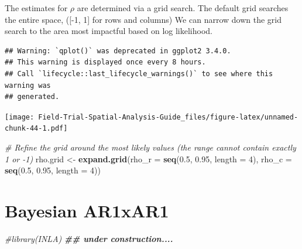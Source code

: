 \documentclass[
]{book}
\newenvironment{Shaded}{\begin{snugshade}}{\end{snugshade}}
\newcommand{\AttributeTok}[1]{\textcolor[rgb]{0.13,0.29,0.53}{#1}}
\newcommand{\CommentTok}[1]{\textcolor[rgb]{0.56,0.35,0.01}{\textit{#1}}}
\newcommand{\DecValTok}[1]{\textcolor[rgb]{0.00,0.00,0.81}{#1}}
\newcommand{\DocumentationTok}[1]{\textcolor[rgb]{0.56,0.35,0.01}{\textbf{\textit{#1}}}}
\newcommand{\FloatTok}[1]{\textcolor[rgb]{0.00,0.00,0.81}{#1}}
\newcommand{\FunctionTok}[1]{\textcolor[rgb]{0.13,0.29,0.53}{\textbf{#1}}}
\newcommand{\NormalTok}[1]{#1}
\newcommand{\OtherTok}[1]{\textcolor[rgb]{0.56,0.35,0.01}{#1}}
\newcommand{\SpecialCharTok}[1]{\textcolor[rgb]{0.81,0.36,0.00}{\textbf{#1}}}
\newcommand{\StringTok}[1]{\textcolor[rgb]{0.31,0.60,0.02}{#1}}
\begin{document}
The estimates for \(\rho\) are determined via a grid search. The default grid searches the entire space, ({[}-1, 1{]} for rows and columns) We can narrow down the grid search to the area most impactful based on log likelihood.

\begin{Shaded}
\end{Shaded}

\begin{verbatim}
## Warning: `qplot()` was deprecated in ggplot2 3.4.0.
## This warning is displayed once every 8 hours.
## Call `lifecycle::last_lifecycle_warnings()` to see where this warning was
## generated.
\end{verbatim}

\texttt{[image: Field-Trial-Spatial-Analysis-Guide\_files/figure-latex/unnamed-chunk-44-1.pdf]}

\begin{Shaded}
\begin{Highlighting}[]
\CommentTok{\# Refine the grid around the most likely values (the range cannot contain exactly 1 or {-}1)}
\NormalTok{rho.grid }\OtherTok{\textless{}{-}} \FunctionTok{expand.grid}\NormalTok{(}\AttributeTok{rho\_r =} \FunctionTok{seq}\NormalTok{(}\FloatTok{0.5}\NormalTok{, }\FloatTok{0.95}\NormalTok{, }\AttributeTok{length =} \DecValTok{4}\NormalTok{),}
                        \AttributeTok{rho\_c =} \FunctionTok{seq}\NormalTok{(}\FloatTok{0.5}\NormalTok{, }\FloatTok{0.95}\NormalTok{, }\AttributeTok{length =} \DecValTok{4}\NormalTok{))}
\end{Highlighting}
\end{Shaded}

\hypertarget{bayesian-ar1xar1}{%
\section{Bayesian AR1xAR1}\label{bayesian-ar1xar1}}

\begin{Shaded}
\begin{Highlighting}[]
\CommentTok{\#library(INLA) }
\DocumentationTok{\#\# under construction....}
\end{Highlighting}
\end{Shaded}
\end{document}
